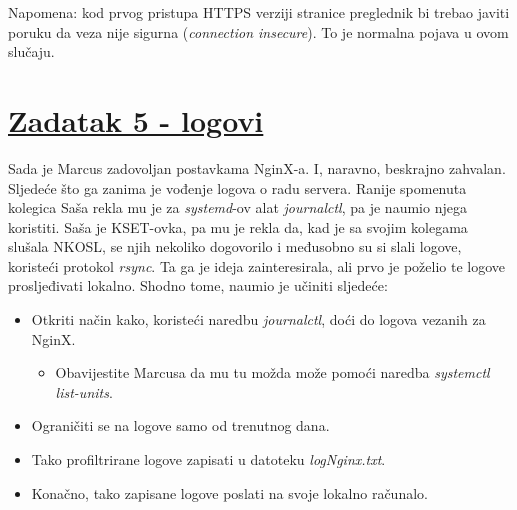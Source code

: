 \documentclass[12pt,a4paper]{article}
\begin{document}
		Napomena: kod prvog pristupa HTTPS verziji stranice preglednik bi trebao javiti poruku da veza nije sigurna (\textit{connection insecure}). To je normalna pojava u ovom slučaju.


	\newpage

	\section*{\underline{Zadatak 5 - logovi}}
		
		Sada je Marcus zadovoljan postavkama NginX-a. I, naravno, beskrajno zahvalan. Sljedeće što ga zanima je vođenje logova o radu servera. Ranije spomenuta kolegica Saša rekla mu je za \textit{systemd}-ov alat \textit{journalctl}, pa je naumio njega koristiti. Saša je KSET-ovka, pa mu je rekla da, kad je sa svojim kolegama slušala NKOSL, se njih nekoliko dogovorilo i međusobno su si slali logove, koristeći protokol \textit{rsync}. Ta ga je ideja zainteresirala, ali prvo je poželio te logove prosljeđivati lokalno. Shodno tome, naumio je učiniti sljedeće:
		\begin{itemize}
			\item Otkriti način kako, koristeći naredbu \textit{journalctl}, doći do logova vezanih za NginX.
			\begin{itemize}
				\item Obavijestite Marcusa da mu tu možda može pomoći naredba \textit{systemctl list-units}.
			\end{itemize}
			\item Ograničiti se na logove samo od trenutnog dana.
			\item Tako profiltrirane logove zapisati u datoteku \textit{logNginx.txt}.
			\item Konačno, tako zapisane logove poslati na svoje lokalno računalo.
		\end{itemize}
		
	\newpage
\end{document}
